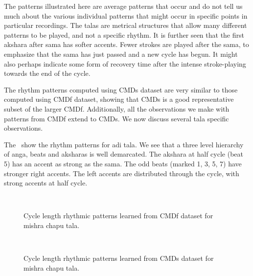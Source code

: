 The patterns illustrated here are average patterns that occur and do not tell us much about the various individual patterns that might occur in specific points in particular recordings. The \glspl{tala} are metrical structures that allow many different patterns to be played, and not a specific rhythm. It is further seen that the first \gls{akshara} after \gls{sama} has softer accents. Fewer strokes are played after the \gls{sama}, to emphasize that the \gls{sama} has just passed and a new cycle has begun. It might also perhaps indicate some form of recovery time after the intense stroke-playing towards the end of the cycle. 

The rhythm patterns computed using \acrshort{CMDs} dataset are very similar to those computed using \acrshort{CMDf} dataset, showing that \acrshort{CMDs} is a good representative subset of the larger \acrshort{CMDf}. Additionally, all the observations we make with patterns from \acrshort{CMDf} extend to \acrshort{CMDs}. We now discuss several \gls{tala} specific observations. 

The \ show the rhythm patterns for \gls{adi} \gls{tala}. We see that a three level hierarchy of \gls{anga}, beats and \glspl{akshara} is well demarcated. The \gls{akshara} at half cycle (beat 5) has an accent as strong as the \gls{sama}. The odd beats (marked 1, 3, 5, 7) have stronger right accents. The left accents are distributed through the cycle, with strong accents at half cycle.  
%
\begin{figure}[t]
\captionsetup[subfigure]{labelformat=empty}
\centering
{} \\ \vspace{-1.35cm}
\caption[Rhythm patterns in \gls{mishra chapu} \gls{tala} learned from \acrshort{CMDf} dataset]{Cycle length rhythmic patterns learned from \acrshort{CMDf} dataset for \gls{mishra chapu} \gls{tala}.}\label{fig:tt:CMDf:mishraChapu}
\end{figure}
%
%
\begin{figure}[t]
\captionsetup[subfigure]{labelformat=empty}
\centering
{} \\ \vspace{-1.35cm}
\caption[Rhythm patterns in \gls{mishra chapu} \gls{tala} learned from \acrshort{CMDs} dataset]{Cycle length rhythmic patterns learned from \acrshort{CMDs} dataset for \gls{mishra chapu} \gls{tala}.}\label{fig:tt:CMD:mishraChapu}
\end{figure}
%


